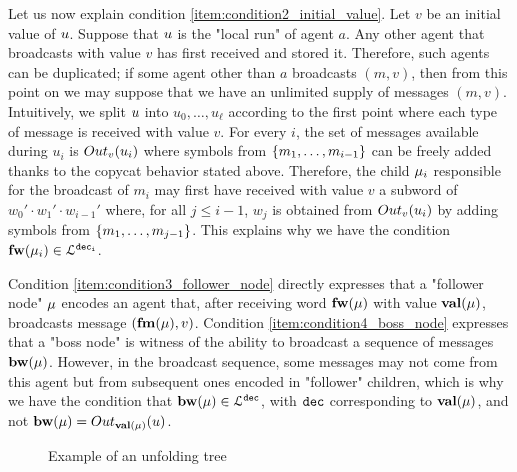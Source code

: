 Let us now explain condition \ref{item:condition2_initial_value}. Let $v$ be an initial value of $u$. Suppose that $u$ is the "local run" of agent $a$. Any other agent that broadcasts with value $v$ has first received and stored it. Therefore, such agents can be duplicated; if some agent other than $a$ broadcasts $(m,v)$, then from this point on we may suppose that we have an unlimited supply of messages $(m,v)$.
Intuitively, we split $u$ into $u_0,\dots,u_\ell$ according to the first point where each type of message is received with value $v$. For every $i$, the set of messages available during $u_i$ is $\voutput{v}{u_i}$ where symbols from $\{m_1,\dots, m_{i-1}\}$ can be freely added thanks to the copycat behavior stated above. Therefore, the child $\mu_i$ responsible for the broadcast of $m_i$ may first have received with value $v$ a subword of $w_0' \cdot w_1' \cdot w_{i-1}'$ where, for all $j \leq i-1$, $w_j$ is obtained from $\voutput{v}{u_i}$ by adding symbols from $\{m_1, \dots, m_{j-1}\}$. This explains why we have the condition $\mathbf{fw}(\mu_i) \in \mathcal{L}^{\mathtt{\mathtt{dec}_i}}$.   

Condition \ref{item:condition3_follower_node} directly expresses that a "follower node" $\mu$ encodes an agent that, after receiving word $\mathbf{fw}(\mu)$ with value $\mathbf{val}(\mu)$, broadcasts message $(\mathbf{fm}(\mu), v)$. Condition \ref{item:condition4_boss_node} expresses that a "boss node" is witness of the ability to broadcast a sequence of messages $\mathbf{bw}(\mu)$. However, in the broadcast sequence, some messages may not come from this agent but from subsequent ones encoded in "follower" children, which is why we have the condition that $\mathbf{bw}(\mu) \in \mathcal{L}^{\mathtt{\mathtt{dec}}}$, with $\mathtt{dec}$ corresponding to $\mathbf{val}(\mu)$, and not $\bosslabel{\node} = \voutput{\valuelabel{\node}}{\localrun}$. 




\begin{figure}
	\begin{center}
		
	\end{center}
	\caption{Example of an unfolding tree}\label{fig-ex-unfolding-tree}
\end{figure}

